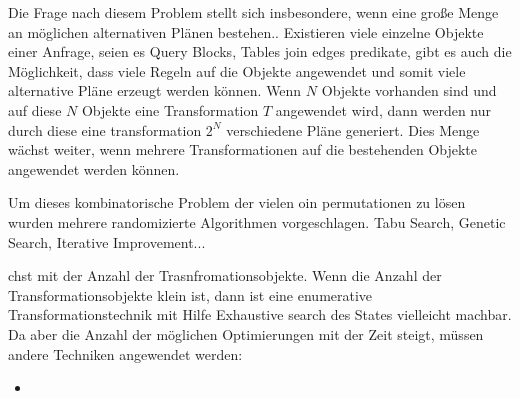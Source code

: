 Die Frage nach diesem Problem stellt sich insbesondere, wenn eine große Menge an möglichen alternativen Plänen bestehen.. Existieren viele einzelne Objekte einer Anfrage, seien es Query Blocks, Tables join edges predikate, gibt es auch die Möglichkeit, dass viele Regeln auf die Objekte angewendet und somit viele alternative Pläne erzeugt werden können. Wenn $N$ Objekte vorhanden sind und auf diese $N$ Objekte eine Transformation $T$ angewendet wird, dann werden nur durch diese eine transformation $2^N$ verschiedene Pläne generiert. Dies Menge wächst weiter, wenn mehrere Transformationen auf die bestehenden Objekte angewendet werden können. 


Um dieses kombinatorische Problem der vielen oin permutationen zu lösen wurden mehrere randomizierte Algorithmen vorgeschlagen. Tabu Search, Genetic Search, Iterative Improvement...

chst mit der Anzahl der Trasnfromationsobjekte. Wenn die Anzahl der Transformationsobjekte klein ist, dann ist eine enumerative Transformationstechnik mit Hilfe Exhaustive search des States vielleicht machbar. Da aber die Anzahl der möglichen Optimierungen mit der Zeit steigt, müssen andere Techniken angewendet werden:

\begin{itemize}
\item 
\end{itemize}




